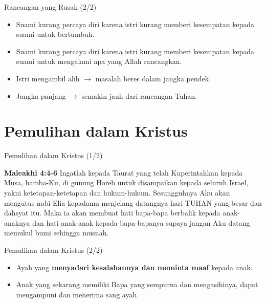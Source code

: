 \documentclass{beamer}
\theoremstyle{mystyle}
\begin{document}
\begin{frame}{Rancangan yang Rusak (2/2)}
	\begin{itemize}
		\item Suami kurang percaya diri karena istri kurang memberi kesempatan kepada suami untuk bertumbuh.
		\item Suami kurang percaya diri karena istri kurang memberi kesempatan kepada suami untuk mengalami apa yang Allah rancangkan.
		\item Istri mengambil alih $\longrightarrow$ masalah beres dalam jangka pendek.
		\item Jangka panjang $\longrightarrow$ semakin jauh dari rancangan Tuhan.
	\end{itemize}
\end{frame}

\section{Pemulihan dalam Kristus}
\begin{frame}{Pemulihan dalam Kristus (1/2)}
	\begin{block}{\textbf{Maleakhi 4:4-6}}
		Ingatlah kepada Taurat yang telah Kuperintahkan kepada Musa, hamba-Ku, di gunung Horeb untuk disampaikan kepada seluruh Israel, yakni ketetapan-ketetapan dan hukum-hukum. Sesungguhnya Aku akan mengutus nabi Elia kepadamu menjelang datangnya hari TUHAN yang besar dan dahsyat itu. Maka ia akan membuat hati bapa-bapa berbalik kepada anak-anaknya dan hati anak-anak kepada bapa-bapanya supaya jangan Aku datang memukul bumi sehingga musnah.
	\end{block}
\end{frame}

\begin{frame}{Pemulihan dalam Kristus (2/2)}
\begin{itemize}
	\item Ayah yang \textbf{menyadari kesalahannya dan meminta maaf} kepada anak.
	\item Anak yang sekarang memiliki Bapa yang sempurna dan mengasihinya, dapat mengampuni dan menerima sang ayah.
\end{itemize}
\end{frame}
\end{document}
